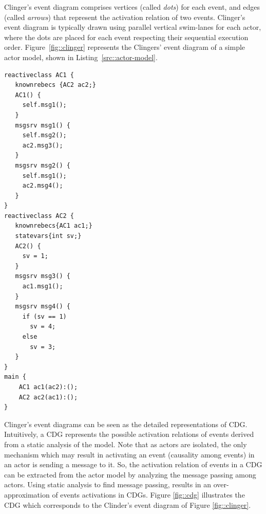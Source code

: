 Clinger's event diagram comprises vertices (called \emph{dots}) for each event, and edges (called \emph{arrows}) that represent the activation relation of two events. Clinger's event diagram is typically drawn using parallel vertical swim-lanes for each actor, where the dots are placed for each event respecting their sequential execution order. Figure~\ref{fig::clinger} represents the Clingers' event diagram of a simple actor model, shown in Listing~\ref{src::actor-model}. 

\begin{lstlisting}[language=rebeca, caption= A simple actor model, label=src::actor-model]
reactiveclass AC1 {
   knownrebecs {AC2 ac2;}
   AC1() {
     self.msg1();
   }
   msgsrv msg1() {
     self.msg2();
     ac2.msg3();
   }
   msgsrv msg2() {
     self.msg1();
     ac2.msg4();
   }
}
reactiveclass AC2 {
   knownrebecs{AC1 ac1;}
   statevars{int sv;}
   AC2() {
     sv = 1;
   }
   msgsrv msg3() {
     ac1.msg1();
   }
   msgsrv msg4() {
     if (sv == 1)
       sv = 4;
     else
       sv = 3;
   }
}
main {
    AC1 ac1(ac2):();
    AC2 ac2(ac1):();
}
\end{lstlisting}

Clinger's event diagrams can be seen as the detailed representations of CDG. Intuitively, a CDG represents the possible activation relations of events derived from a static analysis of the model. Note that as actors are isolated, the only mechanism which may result in activating an event (causality among events) in an actor is sending a message to it. So, the activation relation of events in a CDG can be extracted from the %
actor model by analyzing the message passing among actors. Using static analysis to find message passing, results in an over-approximation of events activations in CDGs. Figure \ref{fig::cdg} illustrates the CDG which corresponds to the Clinder's event diagram of Figure \ref{fig::clinger}.

